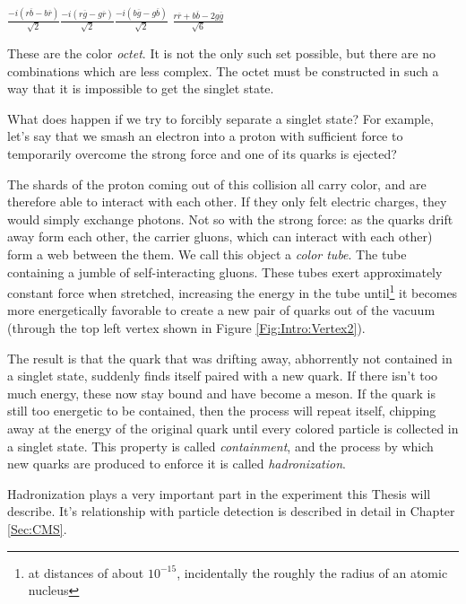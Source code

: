 {\centering  

    $\frac{-i(r\overline{b} - b\overline{r})}{\sqrt{2}}$\hspace{1cm}$\frac{-i(r\overline{g} - g\overline{r})}{\sqrt{2}}$\hspace{1cm}$\frac{-i(b\overline{g} - g\overline{b})}{\sqrt{2}}$ \hspace{1cm}$\frac{r\overline{r} + b\overline{b} -2g\overline{g}}{\sqrt{6}}$
    
    }
    
These are the color \textit{octet}. It is not the only such set possible, but there are no combinations which are less complex. The octet must be constructed in such a way that it is impossible to get the singlet state.

What does happen if we try to forcibly separate a singlet state? For example, let's say that we smash an electron into a proton with sufficient force to temporarily overcome the strong force and one of its quarks is ejected?

The shards of the proton coming out of this collision all carry color, and are therefore able to interact with each other. If they only felt electric charges, they would simply exchange photons. Not so with the strong force: as the quarks drift away form each other, the carrier gluons, which can interact with each other) form a web between the them. We call this object a \textit{color tube}. The tube containing a jumble of self-interacting gluons. These tubes exert approximately constant force when stretched, increasing the energy in the tube until\footnote{at distances of about $10^{-15}$, incidentally the roughly the radius of an atomic nucleus} it becomes more energetically favorable to create a new pair of quarks out of the vacuum (through the top left vertex shown in Figure \ref{Fig:Intro:Vertex2}).

The result is that the quark that was drifting away, abhorrently not contained in a singlet state, suddenly finds itself paired with a new quark. If there isn't too much energy, these now stay bound and have become a meson. If the quark is still too energetic to be contained, then the process will repeat itself, chipping away at the energy of the original quark until every colored particle is collected in a singlet state. This property is called \textit{containment}, and the process by which new quarks are produced to enforce it is called \textit{hadronization}. 

Hadronization plays a very important part in the experiment this Thesis will describe. It's relationship with particle detection is described in detail in Chapter \ref{Sec:CMS}.

